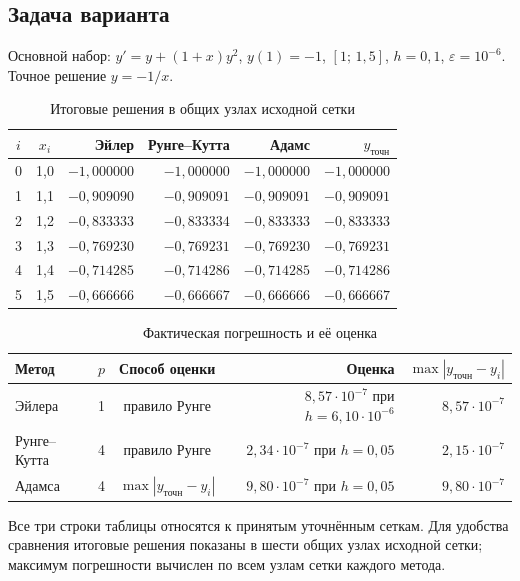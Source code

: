 \documentclass[12pt,a4paper]{article}
\begin{document}
\subsection{Задача варианта}
Основной набор: $y'=y+(1+x)y^2$, $y(1)=-1$, $[1;\,1{,}5]$, $h=0{,}1$,
$\varepsilon=10^{-6}$. Точное решение $y=-1/x$.

\begin{table}[H]\centering\small
\caption{Итоговые решения в общих узлах исходной сетки}
\begin{tabular}{ccrrrr}\toprule
$i$ & $x_i$ & \textcolor{eulercolor}{Эйлер} & \textcolor{rkcolor}{Рунге--Кутта} &
\textcolor{adamscolor}{Адамс} & \textcolor{exactcolor}{$y_{\text{точн}}$}\\\midrule
0 & 1{,}0 & $-1{,}000000$ & $-1{,}000000$ & $-1{,}000000$ & $-1{,}000000$\\
1 & 1{,}1 & $-0{,}909090$ & $-0{,}909091$ & $-0{,}909091$ & $-0{,}909091$\\
2 & 1{,}2 & $-0{,}833333$ & $-0{,}833334$ & $-0{,}833333$ & $-0{,}833333$\\
3 & 1{,}3 & $-0{,}769230$ & $-0{,}769231$ & $-0{,}769230$ & $-0{,}769231$\\
4 & 1{,}4 & $-0{,}714285$ & $-0{,}714286$ & $-0{,}714285$ & $-0{,}714286$\\
5 & 1{,}5 & $-0{,}666666$ & $-0{,}666667$ & $-0{,}666666$ & $-0{,}666667$\\\bottomrule
\end{tabular}\end{table}

\begin{table}[H]\centering\small
\caption{Фактическая погрешность и её оценка}
\begin{tabular}{lccrr}\toprule
Метод & $p$ & Способ оценки & Оценка & $\max|y_{\text{точн}}-y_i|$\\\midrule
Эйлера & 1 & правило Рунге & $8{,}57\cdot10^{-7}$ при $h=6{,}10\cdot10^{-6}$ & $8{,}57\cdot10^{-7}$\\
Рунге--Кутта & 4 & правило Рунге & $2{,}34\cdot10^{-7}$ при $h=0{,}05$ & $2{,}15\cdot10^{-7}$\\
Адамса & 4 & $\max|y_{\text{точн}}-y_i|$ & $9{,}80\cdot10^{-7}$ при $h=0{,}05$ & $9{,}80\cdot10^{-7}$\\\bottomrule
\end{tabular}\end{table}

Все три строки таблицы относятся к принятым уточнённым сеткам. Для удобства
сравнения итоговые решения показаны в шести общих узлах исходной сетки;
максимум погрешности вычислен по всем узлам сетки каждого метода.
\end{document}
